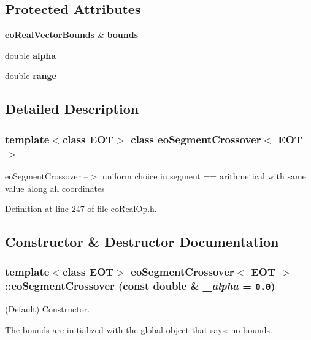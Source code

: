 \subsection*{Protected Attributes}
\begin{CompactItemize}
\item 
{\bf eo\-Real\-Vector\-Bounds} \& {\bf bounds}\label{classeo_segment_crossover_p0}

\item 
double {\bf alpha}\label{classeo_segment_crossover_p1}

\item 
double {\bf range}\label{classeo_segment_crossover_p2}

\end{CompactItemize}


\subsection{Detailed Description}
\subsubsection*{template$<$class EOT$>$ class eo\-Segment\-Crossover$<$ EOT $>$}

eo\-Segment\-Crossover --$>$ uniform choice in segment == arithmetical with same value along all coordinates 



Definition at line 247 of file eo\-Real\-Op.h.

\subsection{Constructor \& Destructor Documentation}
\subsubsection{\setlength{\rightskip}{0pt plus 5cm}template$<$class EOT$>$ {\bf eo\-Segment\-Crossover}$<$ {\bf EOT} $>$::{\bf eo\-Segment\-Crossover} (const double \& {\em \_\-alpha} = {\tt 0.0})\hspace{0.3cm}{\tt  [inline]}}\label{classeo_segment_crossover_a0}


(Default) Constructor. 

The bounds are initialized with the global object that says: no bounds.

